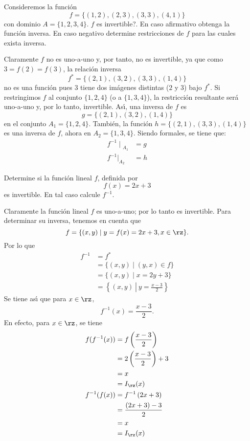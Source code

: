 \begin{example}
Consideremos la funci\'{o}n
\[
f=\{(1,2),(2,3),(3,3),(4,1)\}
\]
con dominio $A=\{1,2,3,4\}.$ \textquestiondown $f$ es invertible?. En caso
afirmativo obtenga la funci\'{o}n inversa. En caso negativo determine
restricciones de $f$ para las cuales exista inversa.
\end{example}

\begin{sol}
Claramente $f$ no es uno-a-uno y, por tanto, no es invertible, ya que como
$3=f(2)=f(3)$, la relaci\'{o}n inversa
\[
f^{\ast}=\{(2,1),(3,2),(3,3),(1,4)\}
\]
no es una funci\'{o}n pues $3$ tiene dos im\'{a}genes distintas ($2$ y $3$)
bajo $f^{\ast}$. Si restringimos $f$ al conjunto $\{1,2,4\}$ (o a
$\{1,3,4\}$), la restricci\'{o}n resultante ser\'{a} uno-a-uno y, por lo
tanto, invertible. As\'{\i}, una inversa de $f$ es
\[
g=\{(2,1),(3,2),(1,4)\}
\]
en el conjunto $A_{1}=\{1,2,4\}$. Tambi\'{e}n, la funci\'{o}n
$h=\{(2,1),(3,3),(1,4)\}$ es una inversa de $f$, ahora en $A_{2}=\{1,3,4\}$.
Siendo formales, se tiene que:
\begin{align*}
{f^{-1}\mid}_{A_{1}}  &  =g\\
f^{-1}|_{A_{2}}  &  =h
\end{align*}

\end{sol}

\begin{example}
Determine si la funci\'{o}n lineal $f$, definida por
\[
f(x)=2x+3
\]
es invertible. En tal caso calcule $f^{-1}.$
\end{example}

\begin{sol}
Claramente la funci\'{o}n lineal $f$ es uno-a-uno; por lo tanto es invertible.
Para determinar su inversa, tenemos en cuenta que
\[
f=\{(x,y)\mid y=f(x)=2x+3,x\in\rz\}.
\]
Por lo que
\begin{align*}
f^{-1}  &  =f^{\ast}\\
&  =\{(x,y)\mid(y,x)\in f\}\\
&  =\{(x,y)\mid x=2y+3\}\\
&  =\left\{  (x,y)\ \left\vert \ y=\frac{x-3}{2}\right.  \right\}
\end{align*}
Se tiene as\'{\i} que para $x\in\rz$,
\[
f^{-1}(x)=\frac{x-3}{2}.
\]
En efecto, para $x\in\rz$, se tiene
\begin{align*}
f(f^{-1}(x))  &  =f\left(  \frac{x-3}{2}\right) \\
&  =2\left(  \frac{x-3}{2}\right)  +3\\
&  =x\\
&  =I_{\rz}(x)\\
f^{-1}(f(x))  &  =f^{-1}\left(  2x+3\right) \\
&  =\frac{(2x+3)-3}{2}\\
&  =x\\
&  =I_{\rz}(x)
\end{align*}

\end{sol}

